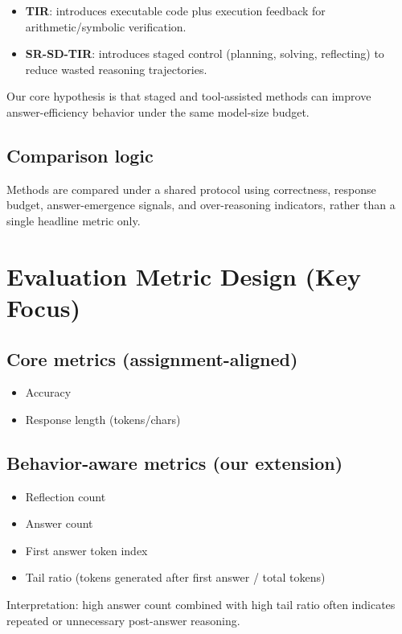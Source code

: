 \documentclass[11pt]{article}
\begin{document}
\begin{itemize}[leftmargin=*]
    \item \textbf{TIR}: introduces executable code plus execution feedback for arithmetic/symbolic verification.
    \item \textbf{SR-SD-TIR}: introduces staged control (planning, solving, reflecting) to reduce wasted reasoning trajectories.
\end{itemize}

Our core hypothesis is that staged and tool-assisted methods can improve answer-efficiency behavior under the same model-size budget.

\subsection{Comparison logic}

Methods are compared under a shared protocol using correctness, response budget, answer-emergence signals, and over-reasoning indicators, rather than a single headline metric only.

\section{Evaluation Metric Design (Key Focus)}

\subsection{Core metrics (assignment-aligned)}
\begin{itemize}[leftmargin=*]
    \item Accuracy
    \item Response length (tokens/chars)
\end{itemize}

\subsection{Behavior-aware metrics (our extension)}
\begin{itemize}[leftmargin=*]
    \item Reflection count
    \item Answer count
    \item First answer token index
    \item Tail ratio (tokens generated after first answer / total tokens)
\end{itemize}

Interpretation: high answer count combined with high tail ratio often indicates repeated or unnecessary post-answer reasoning.
\end{document}
